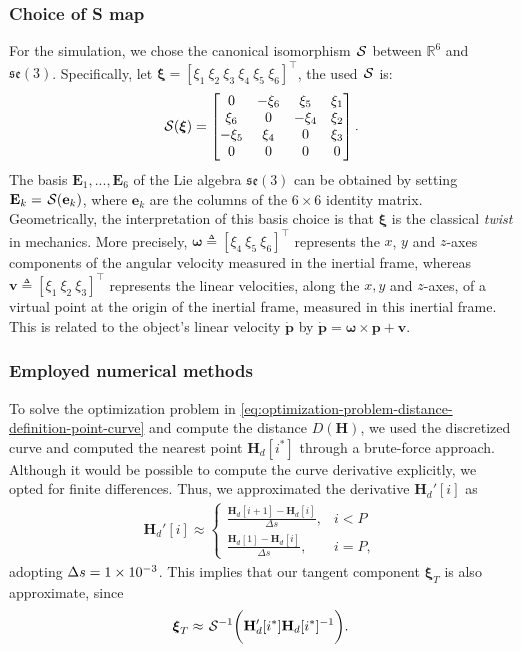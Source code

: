 \subsubsection{Choice of S map}
For the simulation, we chose the canonical isomorphism $\SL$ between $\mathbb{R}^6$ and $\mathfrak{se}(3)$. Specifically, let $\boldsymbol{\xi} = [\xi_1 \ \xi_2 \ \xi_3 \ \xi_4 \ \xi_5 \ \xi_6]^\top$, the used $\SL$ is:
\begin{align}
    \SL[\boldsymbol{\xi}] = \begin{bmatrix}
    0 & -\xi_6 & \xi_5 & \xi_1 \\
    \xi_6 & 0 & -\xi_4 & \xi_2 \\
    -\xi_5 & \xi_4 & 0 & \xi_3 \\
    0 & 0 & 0 & 0
    \end{bmatrix}.
\end{align}
The basis $\mathbf{E}_1, ... ,\mathbf{E}_6$ of the Lie algebra $\mathfrak{se}(3)$ can be obtained by setting $\mathbf{E}_k = \SL[\mathbf{e}_k]$, where $\mathbf{e}_k$ are the columns of the $6 \times 6$ identity matrix. Geometrically, the interpretation of this basis choice is that $\boldsymbol{\xi}$ is the classical \emph{twist} in mechanics. More precisely, $\boldsymbol{\omega} \triangleq [\xi_4 \  \xi_5 \  \xi_6]^\top$ represents the $x$, $y$ and $z$-axes components of the angular  velocity  measured in the inertial frame, whereas $\mathbf{v} \triangleq [\xi_1 \  \xi_2 \  \xi_3]^\top$ represents the linear velocities, along the $x, y$ and $z$-axes, of a virtual point at the origin of the inertial frame, measured in this inertial frame. This is related to the object's linear velocity $\dot{\mathbf{p}}$  by $\dot{\mathbf{p}} = \boldsymbol{\omega} \times \mathbf{p} + \mathbf{v}$.

\subsubsection{Employed numerical methods}
To solve the optimization problem in \eqref{eq:optimization-problem-distance-definition-point-curve} and compute the distance $D(\mathbf{H})$, we used the discretized curve and computed the nearest point $\mathbf{H}_d[i^*]$ through a brute-force approach. Although it would be possible to compute the curve derivative explicitly, we opted for finite differences. Thus, we approximated the derivative $\mathbf{H}_d'[i]$ as
\begin{align}
    \mathbf{H}_d'[i] \approx \begin{cases}
        \frac{\mathbf{H}_d[i+1] - \mathbf{H}_d[i]}{\Delta s}, &  i < P\\    
        \frac{\mathbf{H}_d[1] - \mathbf{H}_d[i]}{\Delta s}, &  i = P,
    \end{cases}
\end{align}
adopting $\Delta s = \num{1E-3}$. This implies that our tangent component $\boldsymbol{\xi}_T$ is also approximate, since
\begin{align}
    \boldsymbol{\xi}_T \approx \invSL\biggl(\mathbf{H}_d'[i^*]\mathbf{H}_d[i^*]^{-1}\biggr).
\end{align}

